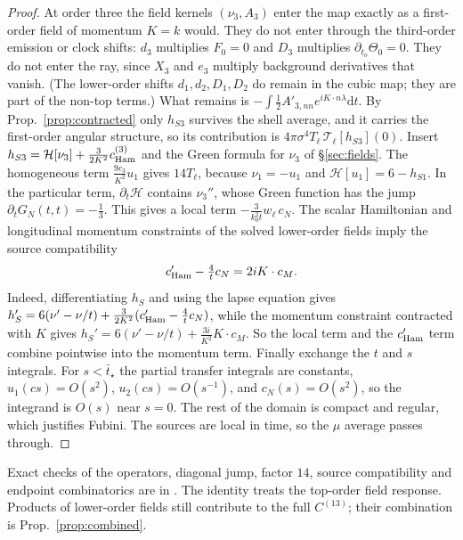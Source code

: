 \documentclass[11pt]{article}
\theoremstyle{definition}
\theoremstyle{remark}
\newcommand{\dd}{\mathrm{d}}
\begin{document}
\begin{proof}
At order three the field kernels $(\nu_3,A_3)$ enter the map exactly as a first-order field of
momentum $K=k$ would. They do not enter through the third-order emission or clock shifts:
$d_3$ multiplies $F_0=0$ and $D_3$ multiplies $\partial_{t_o}\Theta_0=0$. They do not enter the
ray, since $X_3$ and $e_3$ multiply background derivatives that vanish. (The lower-order
shifts $d_1,d_2,D_1,D_2$ do remain in the cubic map; they are part of the non-top terms.) What
remains is $-\int\frac12A'_{3,nn}e^{iK\cdot n\lambda}\dd t$. By Prop.~\ref{prop:contracted} only
$h_{S3}$ survives the shell average, and it carries the first-order angular structure, so its
contribution is $4\pi\sigma^4T_\ell\,\mathcal T_\ell[h_{S3}](0)$. Insert
$h_{S3}=\mathcal H[\nu_3]+\frac{3}{2K^2}c^{(3)}_{\rm Ham}$ and the Green formula for $\nu_3$ of
\S\ref{sec:fields}. The homogeneous term $\frac{9c_3}{K^2}u_1$ gives $14T_\ell$, because
$\nu_1=-u_1$ and $\mathcal H[u_1]=6-h_{S1}$. In the particular term, $\partial_t\mathcal H$
contains $\nu_3''$, whose Green function has the jump $\partial_tG_N(t,t)=-\frac13$. This gives
a local term $-\frac{3}{k_0^2t}w_\ell\,c_N$. The scalar Hamiltonian and longitudinal momentum
constraints of the solved lower-order fields imply the source compatibility
\[
c_{\rm Ham}'-\tfrac4tc_N=2iK\cdot c_M .
\]
Indeed, differentiating $h_S$ and using the lapse equation gives
$h_S'=6(\nu'-\nu/t)+\frac{3}{2K^2}(c_{\rm Ham}'-\frac4tc_N)$, while the momentum constraint
contracted with $K$ gives $h_S'=6(\nu'-\nu/t)+\frac{3i}{K^2}K\cdot c_M$. So the local term and the $c_{\rm Ham}'$ term combine
pointwise into the momentum term. Finally exchange the $t$ and $s$ integrals. For $s<\bar t_\star$
the partial transfer integrals are constants, $u_1(cs)=O(s^2)$, $u_2(cs)=O(s^{-1})$, and
$c_N(s)=O(s^2)$, so the integrand is $O(s)$ near $s=0$. The rest of the domain is compact and
regular, which justifies Fubini. The sources are local in time, so the $\mu$ average passes
through.
\end{proof}
Exact checks of the operators, diagonal jump, factor $14$, source compatibility and endpoint
combinatorics are in .
The identity treats the top-order field response. Products of lower-order fields still
contribute to the full $C^{(13)}$; their combination is Prop.~\ref{prop:combined}.


\end{document}
